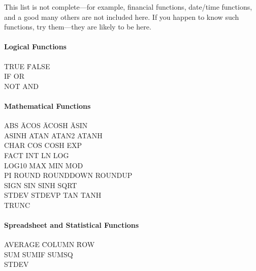 This list is not complete---for
example, financial functions, date/time functions, and a good many
others are not included here.  If you happen to know such functions,
try them---they are likely to be here.

\paragraph*{Logical Functions}
\begin{center}
\begin{tabbing}	
TRUE \hspace{1in} \= FALSE \\
IF               \> OR   \\
NOT              \>       AND
\end{tabbing}
\end{center}
%
\paragraph*{Mathematical Functions}
\begin{tabbing}
ABS \hspace*{1in} \=  ACOS \hspace*{1in}  \= ACOSH \hspace*{1in} \=  ASIN \\
ASINH    \>  ATAN  \>  ATAN2  \>  ATANH \\
CHAR     \>  COS   \>  COSH   \>  EXP   \\
FACT     \>  INT   \>  LN     \>  LOG  \\
LOG10    \>  MAX   \>  MIN    \>  MOD  \\
PI       \>  ROUND \>  ROUNDDOWN   \>  ROUNDUP \\
SIGN     \>  SIN   \>  SINH   \>  SQRT   \\
STDEV    \>  STDEVP \> TAN    \>  TANH  \\
TRUNC   \\
\end{tabbing}

\paragraph*{Spreadsheet and Statistical Functions}
\begin{tabbing}	
AVERAGE  \hspace{1in}  \=  COLUMN \hspace{1in}  \=  ROW  \\
SUM     \>  SUMIF  \>  SUMSQ \\
STDEV
\end{tabbing}

